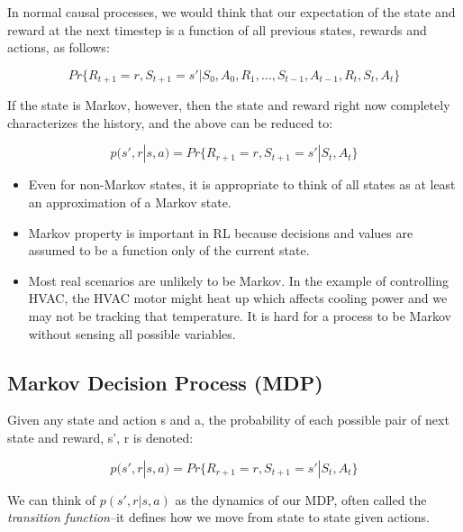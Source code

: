 In normal causal processes, we would think that our expectation of the state and reward at the next timestep is a function of all previous states, rewards and actions, as follows:

\begin{equation}
	Pr \{R_{t+1} = r, S_{t+1} = s' | S_0, A_0, R_1, \ldots, S_{t-1}, A_{t-1}, R_t, S_t, A_t\}  
\end{equation}

If the state is Markov, however, then the state and reward right now completely characterizes the history, and the above can be reduced to:

\begin{equation}
p(s', r | s, a) = Pr \{R_{r+1} = r, S_{t+1} = s' | S_t, A_t\}
\end{equation}

\begin{itemize}
\item Even for non-Markov states, it is appropriate to think of all states as at least an approximation of a Markov state.
\item Markov property is important in RL because decisions and values are assumed to be a function only of the current state.
\item Most real scenarios are unlikely to be Markov. In the example of controlling HVAC, the HVAC motor might heat up which affects cooling power and we may not be tracking that temperature. It is hard for a process to be Markov without sensing all possible variables.
\end{itemize}

\subsection{Markov Decision Process (MDP)}
Given any state and action s and a, the probability of each possible pair of next state and reward, s', r is denoted:

\begin{equation}
p(s', r | s, a) = Pr \{R_{r+1} = r, S_{t+1} = s' | S_t, A_t\}
\end{equation}

We can think of \(p(s', r | s, a)\) as the dynamics of our MDP, often called the \textit{transition function}–it defines how we move from state to state given actions. 

